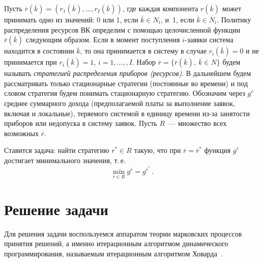 \begin{multicols}{2}
  Пусть $\overline{r}(\overline{k}) = (r_1(\overline{k}),\ldots ,
r_I(\overline{k}))$, где каждая компонента $r(\overline{k})$ может принимать
одно из значений: 0 или 1, если $\overline{k}\in N_i$, и~1, если
$\overline{k} \in \overline{N}_i$. Политику распределения ресурсов ВК
определим с помощью целочисленной функции $\overline{r}(\overline{k})$
сле\-ду\-ющим образом. Если в момент поступления $i$-заявки система находится
в состоянии $\overline{k}$, то она принимается в систему в случае
$r_i(\overline{k})=0$ и не принимается при $r_i(\overline{k})=1$, $i=1,\ldots , ,
I$. Набор $\overline{r} = \{ \overline{r}(\overline{k}),\ \overline{k}\in N\}$ будем
называть \textit{стратегией распределения приборов (ресурсов)}. В дальнейшем будем
рассматривать только стационарные стратегии (постоянные во времени) и под
словом стратегия будем понимать стационарную стратегию. Обозначим через
$g^{\overline{r}}$ среднее суммарного дохода (предполагаемой платы за
выполнение заявок, включая и локальные), теряемого системой в единицу
времени из-за занятости приборов или недопуска в систему заявок. Пусть
  $R$~--- множество всех возможных $\overline{r}$.

  Ставится задача: найти стратегию $\overline{r}^* \in R$ такую, что при
$\overline{r} = \overline{r}^*$ функция $g^{\overline{r}}$ достигает
минимального значения, т.\,е.
  \begin{equation*}
  \underset{\overline{r}\in R}{\min} g^{\overline{r}} = g^{\overline{r}^*}\,.
  \end{equation*}

\section{Решение задачи}

  Для решения задачи воспользуемся аппаратом теории марковских процессов
принятия решений, а именно итерационным алгоритмом динамического
программирования, называемым итерационным алгоритмом
  Ховарда~\cite{6ag, 7ag}.


\end{multicols}
